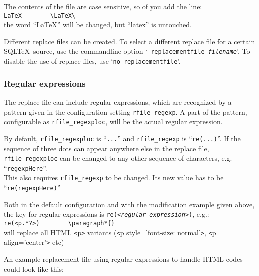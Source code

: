 \documentclass{article}
\newcommand{\vs}{\vspace{3mm}}
\begin{document}
The contents of the file are case sensitive, so of you add the line: \\
\verb+LaTeX        \LaTeX\+ \\
the word ``LaTeX'' will be changed, but ``latex'' is untouched.

\vspace{3mm}

Different replace files can be created. To select a different replace file for a certain SQL\TeX\ source, use the commandline option
`\texttt{--replacementfile \textit{filename}}'. To disable the use of replace files, use `\texttt{no-replacementfile}'.

\subsubsection{Regular expressions}\label{regexp}

The replace file can include regular expressions, which are recognized by a pattern given in the configuration setting \texttt{rfile\_regexp}. A part of the pattern, configurable as \texttt{rfile\_regexploc}, will be the actual regular expression.

\vs

By default, \texttt{rfile\_regexploc} is ``\texttt{...}'' and \texttt{rfile\_regexp} is ``\texttt{re(...)}''. If the sequence of three dots can appear anywhere else in the replace file, \texttt{rfile\_regexploc} can be changed to any other sequence of characters, e.g. ``\texttt{regexpHere}''.\\
This also requires \texttt{rfile\_regexp} to be changed. Its new value has to be ``\texttt{re(regexpHere)}''
 
\vs

Both in the default configuration and with the modification example given above, the key for regular expressions is \texttt{re(<\textit{regular expression}>)}, e.g.:\\
\hspace{3mm}\verb+re(<p.*?>)		\paragraph*{}+ \\
will replace all HTML \texttt{<}p\texttt{>} variants (\texttt{<}p style='font-size: normal'\texttt{>}, \texttt{<}p align='center'\texttt{>} etc)

\vs

An example replacement file using regular expressions to handle HTML codes could look like this:
\end{document}
